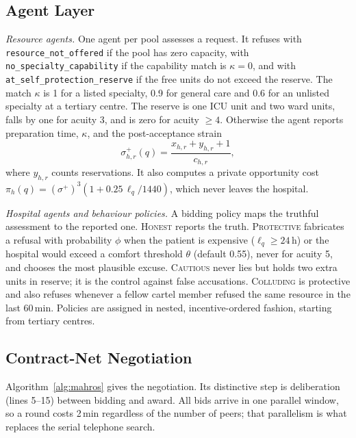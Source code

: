 \subsection{Agent Layer}
\label{sec:agents}
\emph{Resource agents.} One agent per pool assesses a request. It refuses with \texttt{resource\_not\_offered} if the pool has zero capacity, with \texttt{no\_specialty\_capability} if the capability match is $\kappa=0$, and with \texttt{at\_self\_protection\_reserve} if the free units do not exceed the reserve. The match $\kappa$ is 1 for a listed specialty, 0.9 for general care and 0.6 for an unlisted specialty at a tertiary centre. The reserve is one ICU unit and two ward units, falls by one for acuity 3, and is zero for acuity $\ge4$. Otherwise the agent reports preparation time, $\kappa$, and the post-acceptance strain
\begin{equation}
  \sigma^{+}_{h,r}(q) = \frac{x_{h,r}+y_{h,r}+1}{c_{h,r}},
  \label{eq:strain}
\end{equation}
where $y_{h,r}$ counts reservations. It also computes a private opportunity cost $\pi_h(q)=(\sigma^{+})^3(1+0.25\,\ell_q/1440)$, which never leaves the hospital.

\emph{Hospital agents and behaviour policies.} A bidding policy maps the truthful assessment to the reported one. \textsc{Honest} reports the truth. \textsc{Protective} fabricates a refusal with probability $\phi$ when the patient is expensive ($\ell_q\ge24$\,h) or the hospital would exceed a comfort threshold $\theta$ (default 0.55), never for acuity 5, and chooses the most plausible excuse. \textsc{Cautious} never lies but holds two extra units in reserve; it is the control against false accusations. \textsc{Colluding} is protective and also refuses whenever a fellow cartel member refused the same resource in the last 60\,min. Policies are assigned in nested, incentive-ordered fashion, starting from tertiary centres.

\subsection{Contract-Net Negotiation}
\label{sec:protocol}
Algorithm~\ref{alg:mahros} gives the negotiation. Its distinctive step is deliberation (lines 5--15) between bidding and award. All bids arrive in one parallel window, so a round costs 2\,min regardless of the number of peers; that parallelism is what replaces the serial telephone search.


